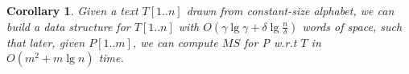 \documentclass[smallabstract,smallcaptions]{dccpaper}
\newtheorem{corollary}{Corollary}
\begin{document}

\begin{corollary}
	\label{coro: constant-sigma}
	Given a text $T[1..n]$ drawn from constant-size alphabet, we can build a data structure for $T[1..n]$ with $O(\gamma \lg \gamma + \delta \lg \frac{n}{\delta})$ words of space, such that later, given $P[1..m]$, we can compute $MS$ for P w.r.t $T$ in $O(m^2 + m\lg n)$ time.
\end{corollary}

\end{document}
